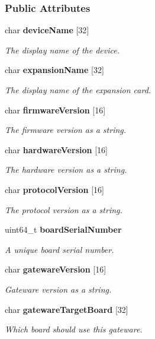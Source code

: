 \subsubsection*{Public Attributes}
\begin{DoxyCompactItemize}
\item 
char {\bf device\+Name} [32]
\begin{DoxyCompactList}\small\item\em The display name of the device. \end{DoxyCompactList}\item 
char {\bf expansion\+Name} [32]
\begin{DoxyCompactList}\small\item\em The display name of the expansion card. \end{DoxyCompactList}\item 
char {\bf firmware\+Version} [16]
\begin{DoxyCompactList}\small\item\em The firmware version as a string. \end{DoxyCompactList}\item 
char {\bf hardware\+Version} [16]
\begin{DoxyCompactList}\small\item\em The hardware version as a string. \end{DoxyCompactList}\item 
char {\bf protocol\+Version} [16]
\begin{DoxyCompactList}\small\item\em The protocol version as a string. \end{DoxyCompactList}\item 
uint64\+\_\+t {\bf board\+Serial\+Number}
\begin{DoxyCompactList}\small\item\em A unique board serial number. \end{DoxyCompactList}\item 
char {\bf gateware\+Version} [16]
\begin{DoxyCompactList}\small\item\em Gateware version as a string. \end{DoxyCompactList}\item 
char {\bf gateware\+Target\+Board} [32]
\begin{DoxyCompactList}\small\item\em Which board should use this gateware. \end{DoxyCompactList}\end{DoxyCompactItemize}



